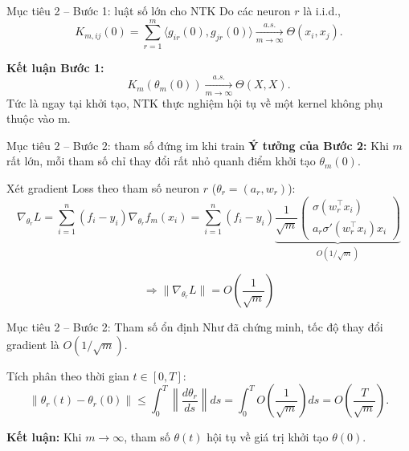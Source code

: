 
\begin{frame}{Mục tiêu 2 – Bước 1: luật số lớn cho NTK}
  Do các neuron $r$ là i.i.d.,
  \[
    K_{m,ij}(0)
    = \sum_{r=1}^m \big\langle g_{ir}(0),g_{jr}(0)\big\rangle
    \xrightarrow[m\to\infty]{a.s.} \Theta(x_i,x_j).
  \]

  \textbf{Kết luận Bước 1:}
  \[
    K_m(\theta_m(0)) \xrightarrow[m\to\infty]{a.s.} \Theta(X,X).
  \]
  Tức là ngay tại khởi tạo, NTK thực nghiệm hội tụ về một kernel không phụ thuộc vào m.
\end{frame}

\begin{frame}{Mục tiêu 2 – Bước 2: tham số đứng im khi train}
  \textbf{Ý tưởng của Bước 2:}  
  Khi $m$ rất lớn, mỗi tham số chỉ thay đổi rất nhỏ quanh điểm khởi tạo $\theta_m(0)$.

 \vspace{0.3cm}
  
  Xét gradient Loss theo tham số neuron $r$ ($\theta_r = (a_r, w_r)$):
  \[
    \nabla_{\theta_r} L 
    = \sum_{i=1}^n (f_i - y_i) \nabla_{\theta_r} f_m(x_i)
    = \sum_{i=1}^n (f_i - y_i) \underbrace{\frac{1}{\sqrt{m}} \begin{pmatrix} \sigma(w_r^\top x_i) \\ a_r \sigma'(w_r^\top x_i) x_i \end{pmatrix}}_{O(1/\sqrt{m})}
  \]
  
  \[
    \Rightarrow \|\nabla_{\theta_r} L\| = O\left(\frac{1}{\sqrt{m}}\right)
  \]


\end{frame}

\begin{frame}{Mục tiêu 2 – Bước 2: Tham số ổn định}
  Như đã chứng minh, tốc độ thay đổi gradient là $O(1/\sqrt{m})$.
  
  Tích phân theo thời gian $t \in [0,T]$:
  \[
    \|\theta_r(t) - \theta_r(0)\| 
    \le \int_0^T \left\| \frac{d\theta_r}{ds} \right\| ds 
    = \int_0^T O\left(\frac{1}{\sqrt{m}}\right) ds
    = O\left(\frac{T}{\sqrt{m}}\right).
  \]

  \textbf{Kết luận:} Khi $m \to \infty$, tham số $\theta(t)$ hội tụ về giá trị khởi tạo $\theta(0)$.
\end{frame}

